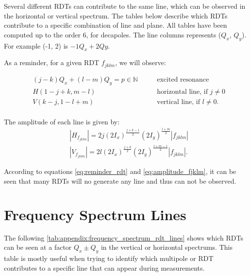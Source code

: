 Several different RDTs can contribute to the same line, which can be observed in the horizontal or vertical spectrum. The tables below describe which RDTs contribute to a specific combination of line and plane.
All tables have been computed up to the order 6, for decapoles.
The line columns represents ($Q_x$, $Q_y$). For example (-1, 2) is \(-1Q_x + 2Qy\).

As a reminder, for a given RDT $f_{jklm}$, we will observe:

\begin{equation}\begin{aligned}
& (j-k)Q_x + (l-m)Q_y = p \in \mathbb{N} \quad\quad& \mbox{excited resonance}\\
& H(1 - j + k, m - l) \quad\quad& \mbox{horizontal line, if } j \ne 0 \\
& V(k - j, 1 - l + m) \quad\quad& \mbox{vertical line, if } l \ne 0. \\
\end{aligned}
\label{eq:reminder_rdt}
\end{equation}

The amplitude of each line is given by:
\begin{equation}
    \begin{aligned}
    &|H_{f_{jklm}}| = 2 j (2 I_x)^\frac{j+k-1}{2} (2 I_y)^\frac{l+m}{2} |f_{jklm}| \\
    &|V_{f_{jklm}}| = 2 l (2 I_x)^\frac{j+k}{2} (2 I_y)^\frac{l+m-1}{2} |f_{jklm}|.
    \label{eq:amplitude_fjklm}
    \end{aligned}
\end{equation}

According to equations \ref{eq:reminder_rdt} and \ref{eq:amplitude_fjklm}, it can be seen that many RDTs will no generate any line and thus can not be observed.

\section{Frequency Spectrum Lines}

The following \cref{tab:appendix:frequency_spectrum_rdt_lines} shows which RDTs can be seen at a 
factor $Q_x \pm Q_y$ in the vertical or horizontal spectrums. This table is mostly useful when
trying to identify which multipole or RDT contributes to a specific line that can appear during 
measurements.

